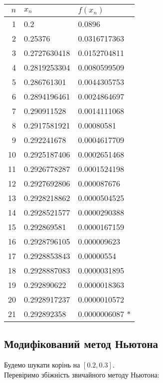 \begin{table}[H]
    \centering
    \begin{tabular}{|r|l|l|}
        \hline
        $n$ & $x_n$ & $f(x_n)$ \\ \hline
        1 & 0.2 & 0.0896 \\
        2 & 0.25376 & 0.0316717363 \\
        3 & 0.2727630418 & 0.0152704811 \\
        4 & 0.2819253304 & 0.0080599509 \\
        5 & 0.286761301 & 0.0044305753 \\
        6 & 0.2894196461 & 0.0024864697 \\
        7 & 0.290911528 & 0.0014111068 \\
        8 & 0.2917581921 & 0.00080581 \\
        9 & 0.292241678 & 0.0004617709 \\
        10 & 0.2925187406 & 0.0002651468 \\
        11 & 0.2926778287 & 0.0001524198 \\
        12 & 0.2927692806 & 0.000087676 \\
        13 & 0.2928218862 & 0.0000504525 \\
        14 & 0.2928521577 & 0.0000290388 \\
        15 & 0.292869581 & 0.0000167159 \\
        16 & 0.2928796105 & 0.000009623 \\
        17 & 0.2928853843 & 0.00000554 \\
        18 & 0.2928887083 & 0.0000031895 \\
        19 & 0.292890622 & 0.0000018363 \\
        20 & 0.2928917237 & 0.0000010572 \\
        21 & 0.292892358 & 0.0000006087 * \\ \hline
    \end{tabular}
\end{table}

\subsection{Модифікований метод Ньютона}

Будемо шукати корінь на $[0.2, 0.3]$. \\

Перевіримо збіжність звичайного методу Ньютона: \\

